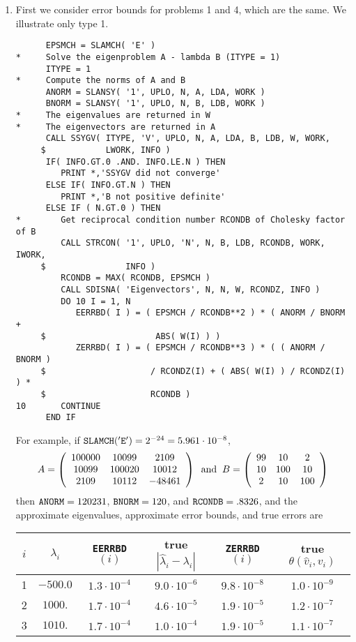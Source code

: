 \begin{enumerate}

\item First we consider error bounds for problems 1 and 4, which are the same.
We illustrate only type 1.


\begin{verbatim}
      EPSMCH = SLAMCH( 'E' )
*     Solve the eigenproblem A - lambda B (ITYPE = 1)
      ITYPE = 1
*     Compute the norms of A and B
      ANORM = SLANSY( '1', UPLO, N, A, LDA, WORK )
      BNORM = SLANSY( '1', UPLO, N, B, LDB, WORK )
*     The eigenvalues are returned in W
*     The eigenvectors are returned in A
      CALL SSYGV( ITYPE, 'V', UPLO, N, A, LDA, B, LDB, W, WORK,
     $            LWORK, INFO )
      IF( INFO.GT.0 .AND. INFO.LE.N ) THEN
         PRINT *,'SSYGV did not converge'
      ELSE IF( INFO.GT.N ) THEN
         PRINT *,'B not positive definite'
      ELSE IF ( N.GT.0 ) THEN
*        Get reciprocal condition number RCONDB of Cholesky factor of B
         CALL STRCON( '1', UPLO, 'N', N, B, LDB, RCONDB, WORK, IWORK,
     $                INFO )
         RCONDB = MAX( RCONDB, EPSMCH )
         CALL SDISNA( 'Eigenvectors', N, N, W, RCONDZ, INFO )
         DO 10 I = 1, N
            EERRBD( I ) = ( EPSMCH / RCONDB**2 ) * ( ANORM / BNORM +
     $                      ABS( W(I) ) )
            ZERRBD( I ) = ( EPSMCH / RCONDB**3 ) * ( ( ANORM / BNORM )
     $                     / RCONDZ(I) + ( ABS( W(I) ) / RCONDZ(I) ) *
     $                     RCONDB )
10       CONTINUE
      END IF
\end{verbatim}

For example, if
${\tt SLAMCH('E')} = 2^{-24} = 5.961 \cdot 10^{-8}$,
\[
A = \bmat{ccc} 100000 & 10099 & 2109 \\ 10099 & 100020 & 10012 \\
2109 & 10112 & -48461 \emat
\; \; {\rm and} \; \;
B = \bmat{ccc} 99 & 10 & 2 \\ 10 & 100 & 10 \\ 2 & 10 & 100 \emat
\]
then ${\tt ANORM} = 120231$,
${\tt BNORM} = 120$, and
${\tt RCONDB} = .8326$, and
the approximate eigenvalues, approximate error bounds,
and true errors are

\begin{center}
\begin{tabular}{||c|c||c|c||c|c||}
\hline
$i$ & $\lambda_i$ &
{\tt EERRBD}$(i)$ & true $| \hat{\lambda}_i - \lambda_i |$ &
{\tt ZERRBD}$(i)$ & true $\theta ( \hat{v}_i , v_i )$ \\ \hline
1 & $-500.0$ & $1.3 \cdot 10^{-4}$ & $9.0 \cdot 10^{-6}$ &
$9.8 \cdot 10^{-8}$ & $1.0 \cdot 10^{-9}$ \\
2 & $1000.$ & $1.7 \cdot 10^{-4}$ & $4.6 \cdot 10^{-5}$ &
$1.9 \cdot 10^{-5}$ & $1.2 \cdot 10^{-7}$ \\
3 & $1010.$ & $1.7 \cdot 10^{-4}$ & $1.0 \cdot 10^{-4}$ &
$1.9 \cdot 10^{-5}$ & $1.1 \cdot 10^{-7}$ \\ \hline
\end{tabular}
\end{center}


\end{enumerate}
